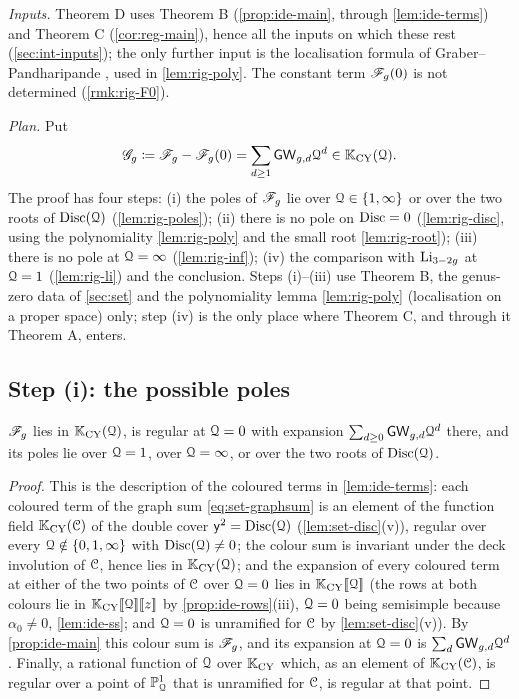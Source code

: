\emph{Inputs.} Theorem D uses Theorem B (\cref{prop:ide-main}, through \cref{lem:ide-terms}) and Theorem C (\cref{cor:reg-main}), hence all the inputs on which these rest (\cref{sec:int-inputs}); the only further input is the localisation formula of Graber--Pandharipande \cite{GP99}, used in \cref{lem:rig-poly}. The constant term $\mathscr{F}_g(0)$ is not determined (\cref{rmk:rig-F0}).

\emph{Plan.} Put
\[
\mathscr{G}_g\coloneqq\mathscr{F}_g-\mathscr{F}_g(0)=\sum_{d\geq 1}\mathsf{GW}_{g,d}\mathcal{Q}^d\in\mathbb{K}_{\mathrm{CY}}(\mathcal{Q}).
\]
The proof has four steps: (i) the poles of $\mathscr{F}_g$ lie over $\mathcal{Q}\in\{1,\infty\}$ or over the two roots of $\operatorname{Disc}(\mathcal{Q})$ (\cref{lem:rig-poles}); (ii) there is no pole on $\operatorname{Disc}=0$ (\cref{lem:rig-disc}, using the polynomiality \cref{lem:rig-poly} and the small root \cref{lem:rig-root}); (iii) there is no pole at $\mathcal{Q}=\infty$ (\cref{lem:rig-inf}); (iv) the comparison with $\operatorname{Li}_{3-2g}$ at $\mathcal{Q}=1$ (\cref{lem:rig-li}) and the conclusion. Steps (i)--(iii) use Theorem B, the genus-zero data of \cref{sec:set} and the polynomiality lemma \cref{lem:rig-poly} (localisation on a proper space) only; step (iv) is the only place where Theorem C, and through it Theorem A, enters.

\subsection{Step (i): the possible poles}

\begin{lem}
\label{lem:rig-poles}
$\mathscr{F}_g$ lies in $\mathbb{K}_{\mathrm{CY}}(\mathcal{Q})$, is regular at $\mathcal{Q}=0$ with expansion $\sum_{d\geq 0}\mathsf{GW}_{g,d}\mathcal{Q}^d$ there, and its poles lie over $\mathcal{Q}=1$, over $\mathcal{Q}=\infty$, or over the two roots of $\operatorname{Disc}(\mathcal{Q})$.
\end{lem}

\begin{proof}
This is the description of the coloured terms in \cref{lem:ide-terms}: each coloured term of the graph sum \eqref{eq:set-graphsum} is an element of the function field $\mathbb{K}_{\mathrm{CY}}(\mathcal{C})$ of the double cover $\mathsf{y}^2=\operatorname{Disc}(\mathcal{Q})$ (\cref{lem:set-disc}(v)), regular over every $\mathcal{Q}\notin\{0,1,\infty\}$ with $\operatorname{Disc}(\mathcal{Q})\neq 0$; the colour sum is invariant under the deck involution of $\mathcal{C}$, hence lies in $\mathbb{K}_{\mathrm{CY}}(\mathcal{Q})$; and the expansion of every coloured term at either of the two points of $\mathcal{C}$ over $\mathcal{Q}=0$ lies in $\mathbb{K}_{\mathrm{CY}}[\![ \mathcal{Q} ]\!]$ (the rows at both colours lie in $\mathbb{K}_{\mathrm{CY}}[\![ \mathcal{Q} ]\!][\![ z ]\!]$ by \cref{prop:ide-rows}(iii), $\mathcal{Q}=0$ being semisimple because $\alpha_0\neq 0$, \cref{lem:ide-ss}; and $\mathcal{Q}=0$ is unramified for $\mathcal{C}$ by \cref{lem:set-disc}(v)). By \cref{prop:ide-main} this colour sum is $\mathscr{F}_g$, and its expansion at $\mathcal{Q}=0$ is $\sum_d\mathsf{GW}_{g,d}\mathcal{Q}^d$. Finally, a rational function of $\mathcal{Q}$ over $\mathbb{K}_{\mathrm{CY}}$ which, as an element of $\mathbb{K}_{\mathrm{CY}}(\mathcal{C})$, is regular over a point of $\mathbb{P}^1_{\mathcal{Q}}$ that is unramified for $\mathcal{C}$, is regular at that point.
\end{proof}

